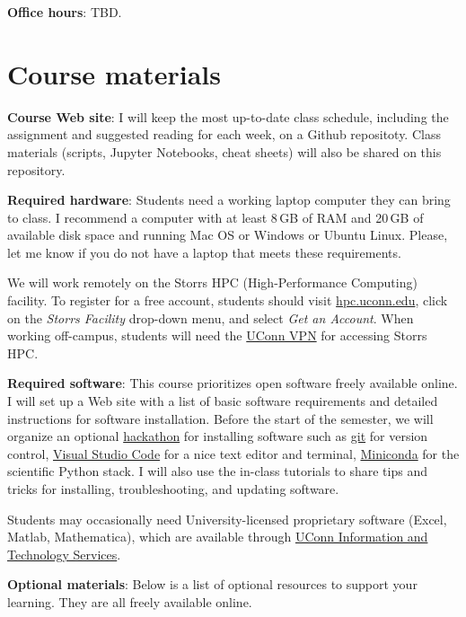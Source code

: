 \documentclass[11pt]{article}
\begin{document}
\textbf{Office hours}: TBD.


\section*{Course materials}

\textbf{Course Web site}: I will keep the most up-to-date class schedule, including the assignment and suggested reading for each week, on a Github repositoty. Class materials (scripts, Jupyter Notebooks, cheat sheets) will also be shared on this repository. 

\textbf{Required hardware}: Students need a working laptop computer they can bring to class. I recommend a computer with at least 8\,GB of RAM and 20\,GB of available disk space and running Mac OS or Windows or Ubuntu Linux.  Please, let me know if you do not have a laptop that meets these requirements. 

We will work remotely on the Storrs HPC (High-Performance Computing) facility. To register for a free account, students should visit \url{hpc.uconn.edu}, click on the \emph{Storrs Facility} drop-down menu, and select \emph{Get an Account}.  When working off-campus, students will need the \href{https://confluence.uconn.edu/ikb/remote-access/virtual-private-network-vpn/accessing-the-uconn-network-through-a-vpn-client}{UConn VPN} for accessing Storrs HPC.


\textbf{Required software}:  This course prioritizes open software freely
available online. I will set up a Web site with a list of basic software
requirements and detailed instructions for software installation. Before the
start of the semester, we will organize an optional
\href{https://hackathon.guide}{hackathon} for installing software such as
\href{https://git-scm.com/book/en/v2/Getting-Started-Installing-Git}{git} for
version control, \href{https://code.visualstudio.com/}{Visual Studio Code} for
a nice text editor and terminal, \href{https://docs.conda.io/en/latest/miniconda.html}{Miniconda} for the scientific Python stack. I will also use the in-class tutorials to share tips and tricks for installing, troubleshooting, and updating software.

Students may occasionally need University-licensed proprietary software (Excel, Matlab, Mathematica), which are available through \href{https://software.uconn.edu/software}{UConn Information and Technology Services}.

\textbf{Optional materials}: Below is a list of optional resources to support your learning. They are all freely available online.
\end{document}
